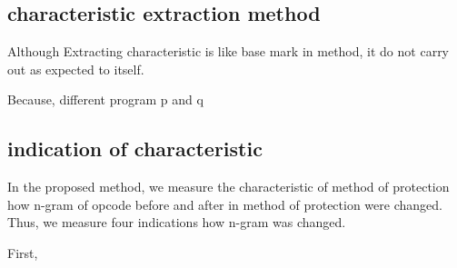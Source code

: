 \documentclass[conference]{IEEEtran}
\begin{document}

\subsection{characteristic extraction method}
Although Extracting characteristic is like base mark in method,
it do not carry out as expected to itself.

Because, different program p and q

\subsection{indication of characteristic}
In the proposed method, we measure the characteristic of method of protection how n-gram of opcode before and after in method of protection were changed.
Thus, we measure four indications how n-gram was changed.


First,

%
%
%
%
%
%
%
%
\end{document}
